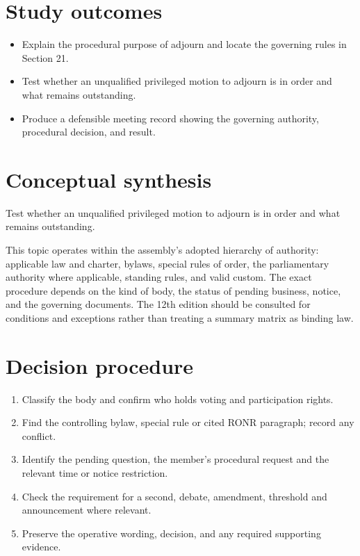 \documentclass[11pt]{article}
\begin{document}
\SuiteOpen
{}
\section{Study outcomes}
\begin{itemize}[leftmargin=*,itemsep=4pt]
\item Explain the procedural purpose of adjourn and locate the governing rules in Section 21.
\item Test whether an unqualified privileged motion to adjourn is in order and what remains outstanding.
\item Produce a defensible meeting record showing the governing authority, procedural decision, and result.
\end{itemize}

\section{Conceptual synthesis}
Test whether an unqualified privileged motion to adjourn is in order and what remains outstanding.

This topic operates within the assembly’s adopted hierarchy of authority: applicable law and charter, bylaws, special rules of order, the parliamentary authority where applicable, standing rules, and valid custom. The exact procedure depends on the kind of body, the status of pending business, notice, and the governing documents. The 12th edition should be consulted for conditions and exceptions rather than treating a summary matrix as binding law.
\section{Decision procedure}
\begin{enumerate}[leftmargin=*,itemsep=4pt]
\item Classify the body and confirm who holds voting and participation rights.
\item Find the controlling bylaw, special rule or cited RONR paragraph; record any conflict.
\item Identify the pending question, the member’s procedural request and the relevant time or notice restriction.
\item Check the requirement for a second, debate, amendment, threshold and announcement where relevant.
\item Preserve the operative wording, decision, and any required supporting evidence.
\end{enumerate}
\end{document}
